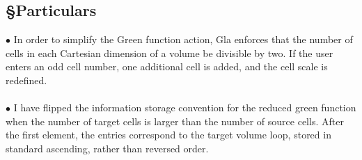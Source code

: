 \documentclass[reprint,aps,prb]{revtex4-2}
\begin{document}
\subsection{\S Particulars}
$\bullet$ In order to simplify the Green function action, Gla enforces that the number of cells in each Cartesian dimension of a volume be divisible by two. 
If the user enters an odd cell number, one additional cell is added, and the cell scale is redefined.
\\ \\
$\bullet$ I have flipped the information storage convention for the reduced green function when the number of target cells is larger than the number of source cells. 
After the first element, the entries correspond to the target volume loop, stored in standard ascending, rather than reversed order.  

\end{document}
